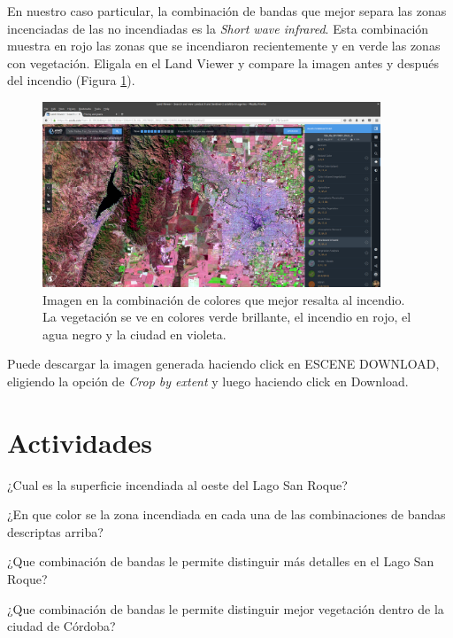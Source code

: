 \documentclass[a4paper,12pt]{book}
\begin{document}
En nuestro caso particular, la combinación de bandas que mejor separa las zonas incenciadas de las no incendiadas es la \emph{Short wave infrared}. Esta combinación muestra en rojo las zonas que se incendiaron recientemente y en verde las zonas con vegetación. Eligala en el Land Viewer y compare la imagen antes y después del incendio (Figura \ref{fig:incendio}).

\begin{figure}[h!]
    \centering
    \includegraphics[width=0.9\textwidth]{fig:incendio.png}
    \caption{Imagen en la combinación de colores que mejor resalta al incendio. La vegetación se ve en colores verde brillante, el incendio en rojo, el agua negro y la ciudad en violeta.}
    \label{fig:incendio}
\end{figure}

Puede descargar la imagen generada haciendo click en ESCENE DOWNLOAD, eligiendo la opción de \emph{Crop by extent} y luego haciendo click en Download.

\section{Actividades}

\begin{que}
    ¿Cual es la superficie incendiada al oeste del Lago San Roque?
\end{que}

\begin{que}
    ¿En que color se la zona incendiada en cada una de las combinaciones de bandas descriptas arriba?
\end{que}

\begin{que}
    ¿Que combinación de bandas le permite distinguir más detalles en el Lago San Roque?
\end{que}

\begin{que}
    ¿Que combinación de bandas le permite distinguir mejor vegetación dentro de la ciudad de Córdoba?
\end{que}
\end{document}
